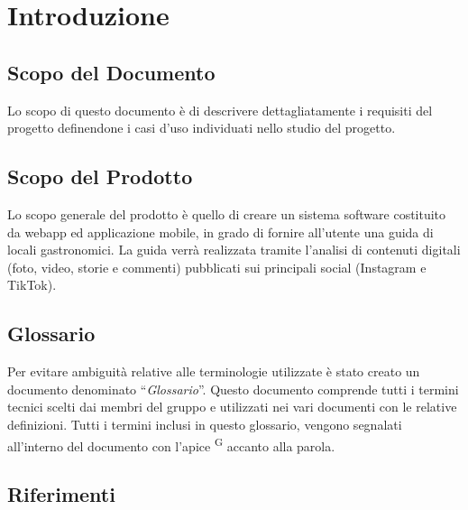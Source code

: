 \section{Introduzione}

\subsection{Scopo del Documento}
Lo scopo di questo documento è di descrivere dettagliatamente i requisiti del progetto definendone i casi d’uso individuati nello studio del progetto.

\subsection{Scopo del Prodotto}

Lo scopo generale del prodotto è quello di creare un sistema software costituito da webapp ed applicazione mobile, in grado di fornire all’utente una guida di locali gastronomici. La guida verrà realizzata tramite l’analisi di contenuti digitali (foto, video, storie e commenti) pubblicati sui principali social (Instagram e TikTok). 

\subsection{Glossario}

Per evitare ambiguità relative alle terminologie utilizzate è stato creato un documento denominato “\textit{Glossario}”. Questo documento comprende tutti i termini tecnici scelti dai membri del gruppo e utilizzati nei vari documenti con le relative definizioni. Tutti i termini inclusi in questo glossario, vengono segnalati all’interno del documento con l’apice \textsuperscript{G} accanto alla parola.

\subsection{Riferimenti}


